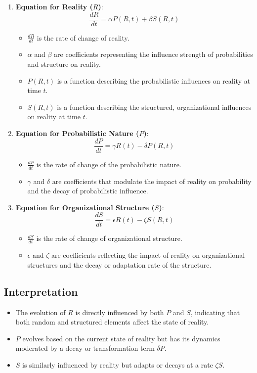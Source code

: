 \documentclass{article}
\begin{document}
\begin{enumerate}
  \item \textbf{Equation for Reality (\(R\))}:
  \[
  \frac{dR}{dt} = \alpha P(R, t) + \beta S(R, t)
  \]
  \begin{itemize}
    \item \( \frac{dR}{dt} \) is the rate of change of reality.
    \item \( \alpha \) and \( \beta \) are coefficients representing the influence strength of probabilities and structure on reality.
    \item \( P(R, t) \) is a function describing the probabilistic influences on reality at time \( t \).
    \item \( S(R, t) \) is a function describing the structured, organizational influences on reality at time \( t \).
  \end{itemize}
 
  \item \textbf{Equation for Probabilistic Nature (\(P\))}:
  \[
  \frac{dP}{dt} = \gamma R(t) - \delta P(R, t)
  \]
  \begin{itemize}
    \item \( \frac{dP}{dt} \) is the rate of change of the probabilistic nature.
    \item \( \gamma \) and \( \delta \) are coefficients that modulate the impact of reality on probability and the decay of probabilistic influence.
  \end{itemize}

  \item \textbf{Equation for Organizational Structure (\(S\))}:
  \[
  \frac{dS}{dt} = \epsilon R(t) - \zeta S(R, t)
  \]
  \begin{itemize}
    \item \( \frac{dS}{dt} \) is the rate of change of organizational structure.
    \item \( \epsilon \) and \( \zeta \) are coefficients reflecting the impact of reality on organizational structures and the decay or adaptation rate of the structure.
  \end{itemize}
\end{enumerate}

\subsection*{Interpretation}

\begin{itemize}
  \item The evolution of \(R\) is directly influenced by both \(P\) and \(S\), indicating that both random and structured elements affect the state of reality.
  \item \(P\) evolves based on the current state of reality but has its dynamics moderated by a decay or transformation term \(\delta P\).
  \item \(S\) is similarly influenced by reality but adapts or decays at a rate \(\zeta S\).
\end{itemize}
\end{document}
